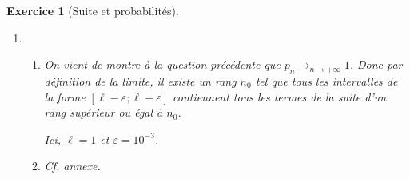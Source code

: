 \documentclass[12pt,a4paper]{article}
\theoremstyle{break}
\theoremstyle{nobreak}
\newtheorem{exercice}{Exercice}
\theoremstyle{nonumberplain}
\begin{document}
\begin{exercice}[Suite et probabilités]
\begin{enumerate}
\begin{enumerate}
          On a donc $\boxed{p_n = \frac1{1 + 2\times\left( \frac14
          \right)^n}.}$
        \item Calculons $\lim_{n\to+\infty} p_n$

          $\lim_{n\to+\infty} \left( \frac14 \right)^n = 0$ donc \[
          \boxed{\lim_{n\to+\infty} p_n =1} \]
      \end{enumerate}
    \item
      \begin{enumerate}
        \item On vient de montre à la question précédente que
          $p_n\mathop{\longrightarrow}_{n\to+\infty}1$. Donc par
          définition de la limite, il existe un rang $n_0$ tel que tous
          les intervalles de la forme $[\ell - \varepsilon ; \ell +
          \varepsilon]$ contiennent tous les termes de la suite d'un
          rang supérieur ou égal à $n_0$.

          Ici, $\ell = 1$ et $\varepsilon = 10^{-3}$.
        \item Cf. annexe.
      \end{enumerate}
  \end{enumerate}
\end{exercice}
\end{document}
